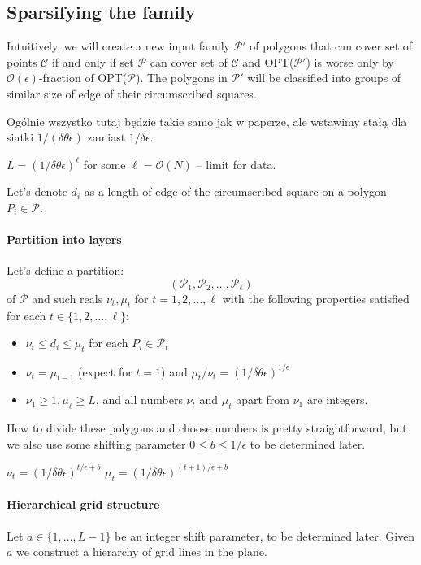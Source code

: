 \documentclass[en]{pracamgr}
\begin{document}
\subsection{Sparsifying the family}
Intuitively, we will create a new input family
$\mathcal{P'}$ of polygons that 
can cover set of points $\mathcal{C}$
if and only if set $\mathcal{P}$
can cover set of $\mathcal{C}$
and OPT($\mathcal{P'}$)
is worse only by $\mathcal{O}(\epsilon)$-fraction of OPT($\mathcal{P}$).
The polygons in $\mathcal{P'}$ will be classified
into groups of similar size of edge of their
circumscribed squares.

Ogólnie wszystko tutaj będzie takie samo jak
w paperze, ale wstawimy stałą dla siatki 
$1/(\delta\theta\epsilon)$
zamiast $1/\delta\epsilon$.

$L = (1/\delta\theta\epsilon)^{\ell}$
for some $\ell = \mathcal{O}(N)$ -- limit for data.

Let's denote $d_i$ as a length of edge of the
circumscribed square on a polygon $P_i \in \mathcal{P}$.

\paragraph{Partition into layers}
Let's define a partition:
$$(\mathcal{P}_1, \mathcal{P}_2, \ldots, \mathcal{P_{\ell}})$$
of $\mathcal{P}$ and such reals $\nu_t, \mu_t$
for $t = 1, 2, \ldots, \ell$ with
the following properties satisfied for each $t \in \{1,2,\ldots, \ell\}$:
\begin{itemize}
\item $\nu_t \le d_i \le \mu_t$ for each $P_i \in \mathcal{P}_t$
\item $\nu_t = \mu_{t-1}$ (expect for $t=1$) and $\mu_t/\nu_t = (1/\delta\theta\epsilon)^{1/\epsilon}$
\item $\nu_1 \ge 1, \mu_\ell \ge L$, and all numbers $\nu_t$ and $\mu_t$ apart from $\nu_1$ are integers.
\end{itemize}

How to divide these polygons and choose numbers
is pretty straightforward,
but we also use some shifting parameter $0 \le b \le 1/\epsilon$
to be determined later.

$\nu_t = (1/\delta\theta\epsilon)^{t/\epsilon + b}$
$\mu_t = (1/\delta\theta\epsilon)^{(t+1)/\epsilon + b}$

\paragraph{Hierarchical grid structure}
Let $a \in \{1, \ldots, L - 1\}$ be an integer shift
parameter, to be determined later. Given $a$
we construct a hierarchy of grid lines in the plane.
\end{document}
